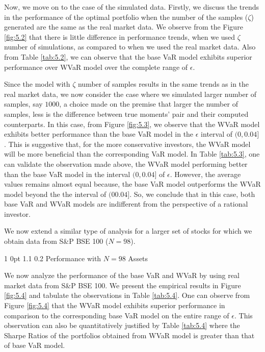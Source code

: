 \documentclass[12pt]{article}
\makeatletter
\numberwithin{equation}{section}
\renewcommand{\subsubsection}{
  \@startsection
  {subsubsection}%
  {1}%
  {0pt}%
  {1.1\baselineskip}%
  {0.2\baselineskip}%
  {\sc \centering}%
}
\makeatother
\begin{document}
Now, we move on to the case of the simulated data. Firstly, we discuss the trends in the performance of the optimal portfolio when the number of the samples ($\zeta$) generated are the same as the real market data. We observe from the Figure \ref{fig:5.2} that there is little difference in performance trends,
when we used $\zeta$ number of simulations, as compared to when we used the real market data. Also from Table \ref{tab:5.2}, we can observe that the base VaR model exhibits superior performance over WVaR model over the complete range of $\epsilon$.

Since the model with $\zeta$ number of samples results in the same trends as in the real market data, we now consider the case where we simulated larger number of samples, say $1000$, a choice made on the premise that larger the number of samples, less is the difference between true moments' pair and their computed counterparts. In this case, from Figure \ref{fig:5.3}, we observe that the WVaR model exhibits better performance than the base VaR model in the $\epsilon$ interval of $(0,0.04]$. This is suggestive that, for the more conservative investors, the WVaR model will be more beneficial than the corresponding VaR model.
In Table \ref{tab:5.3}, one can validate the observation made above, the WVaR model performing better than the base VaR model in the interval $(0,0.04]$ of $\epsilon$. However, the average values remains almost equal because, the base VaR model outperforms the WVaR model beyond the the interval of $(0 0.04]$.
So, we conclude that in this case, both base VaR and WVaR models are indifferent from the perspective of a rational investor.

We now extend a similar type of analysis for a larger set of stocks for which we obtain data from S\&P BSE 100 ($N = 98$).

\subsubsection{Performance with $N=98$ Assets}

We now analyze the performance of the base VaR and WVaR by using real market data from S\&P BSE 100. We present the empirical results in Figure \ref{fig:5.4} and tabulate the observations in Table \ref{tab:5.4}. One can observe from Figure \ref{fig:5.4} that the WVaR model exhibits superior performance in comparison to the corresponding base VaR model on the entire range of $\epsilon$. This observation can also be quantitatively justified by Table \ref{tab:5.4} where the Sharpe Ratios of the portfolios obtained from WVaR model is greater than that of base VaR model.
\end{document}
